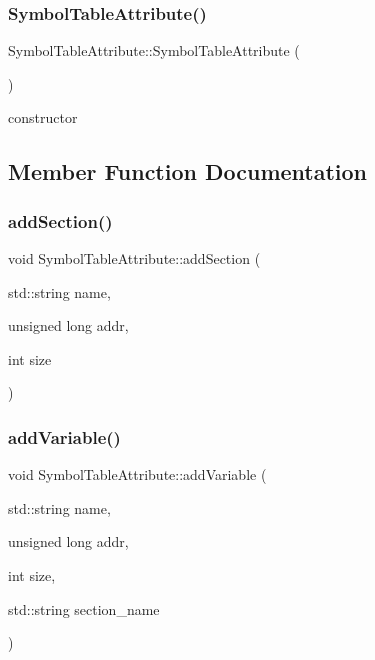 \subsubsection{\texorpdfstring{Symbol\+Table\+Attribute()}{SymbolTableAttribute()}}
{\footnotesize\ttfamily Symbol\+Table\+Attribute\+::\+Symbol\+Table\+Attribute (\begin{DoxyParamCaption}{ }\end{DoxyParamCaption})}

constructor 

\subsection{Member Function Documentation}
\mbox{\label{classSymbolTableAttribute_ac3d05fcd8b84f1b19e313ca35ab46b6a}} 
\subsubsection{\texorpdfstring{add\+Section()}{addSection()}}
{\footnotesize\ttfamily void Symbol\+Table\+Attribute\+::add\+Section (\begin{DoxyParamCaption}\item[{std\+::string}]{name,  }\item[{unsigned long}]{addr,  }\item[{int}]{size }\end{DoxyParamCaption})}

\mbox{\label{classSymbolTableAttribute_a37e4e5f0139566dfd77385ced03c1acb}} 
\subsubsection{\texorpdfstring{add\+Variable()}{addVariable()}}
{\footnotesize\ttfamily void Symbol\+Table\+Attribute\+::add\+Variable (\begin{DoxyParamCaption}\item[{std\+::string}]{name,  }\item[{unsigned long}]{addr,  }\item[{int}]{size,  }\item[{std\+::string}]{section\+\_\+name }\end{DoxyParamCaption})}

